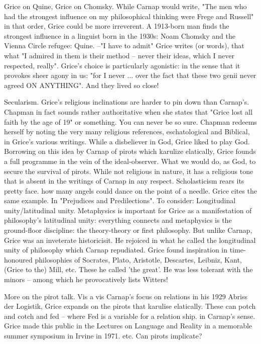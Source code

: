 \documentclass[10pt,titlepage]{book}
\begin{document}
{Grice  on Quine, Grice on Chomsky. While  Carnap would write, "The men who 
had the strongest  influence on my  philosophical thinking were Frege and 
Russell" in that order,  Grice could  be more irreverent. A 1913-born man 
finds the strongest influence in  a  linguist born in the 1930s: Noam Chomsky 
and the Vienna Circle refugee:  Quine.  --"I have to admit" Grice writes (or 
words), that what "I admired  in them is  their method -- never their ideas, 
which I never respected,  really". Grice's choice is particularly agonistic: 
in the sense that it provokes  sheer agony in  us: "for I never ... over 
the fact that these two genii  never agreed ON  ANYTHING". And they lived so 
close!

Secularism.  Grice's religious inclinations are harder to pin down than 
Carnap’s. Chapman in  fact sounds rather authoritative when she states that 
"Grice lost all faith by  the age of 19" or something. You can never be so 
sure. Chapman redeems herself  by noting the very many religious references, 
eschatological and Biblical, in  Grice's various writings. While a disbeliever 
in God, Grice liked to play God.  Borrowing on this idea by Carnap of 
pirots which karulize elatically, Grice  founds a full programme in the vein of 
the ideal-observer. What we would do, as  God, to secure the survival of 
pirots. While not religious in nature, it has a  religious tone that is absent 
in the writings of Carnap in any  respect. 
Scholasticism  rears its pretty face. how many angels could dance on the 
point of a needle.  Grice cites the same example. In "Prejudices and 
Predilections". To consider:  Longitudinal unity/latitudinal unity. Metaphysics is 
important for Grice as a  manifestation of philosophy's latitudinal unity: 
everything connects and  metaphysics is the ground-floor discipline: the 
theory-theory or first  philosophy. But unlike Carnap, Grice was an inveterate 
historicisit. He rejoiced  in what he called the longitudinal unity of 
philosophy which Carnap repudiated.  Grice found inspiration in time-honoured 
philosophies of Socrates, Plato,  Aristotle, Descartes, Leibniz, Kant, (Grice to 
the) Mill, etc. These he called  'the great'. He was less tolerant with the 
minors -- among which he  provocatively lists Witters! 
 
More  on the pirot talk. Vis a vis Carnap’s focus on relations in his 1929  
Abriss der Logistik, Grice expands on the pirots that karulise elatically. 
These  can potch and cotch and fed – where Fed is a variable for a relation 
ship. in  Carnap's sense. Grice made this public in the Lectures on Language 
and Reality  in a  memorable summer symposium in Irvine in 1971. etc. 
Can  pirots implicate?

}
\end{document}

